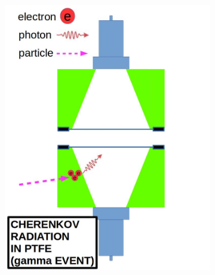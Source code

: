 \begin{figure}[!p]
	\centering
	\begin{subfigure}[b]{.4\textwidth}
		\centering
		\includegraphics[width=\figurewidth,clip,trim={0 0 0 0},angle=0,origin=c]{Figures/GasTest/WeiDrawEvent/Cherenkov.jpg}
		\caption{}
		\label{fig:Chrenkov a}
	\end{subfigure}
	\begin{subfigure}[b]{.4\textwidth}
		\centering

\end{subfigure}
\end{figure}
